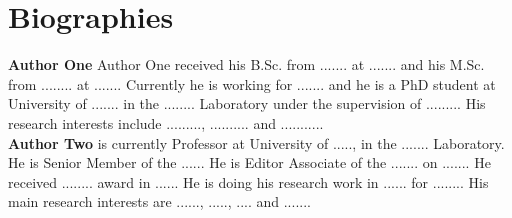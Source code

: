 \documentclass[a4paper, twoside]{article}
\begin{document}










\newpage
\section*{Biographies}

 \textbf{Author One} \small Author One received his B.Sc. from .......  at ....... and his M.Sc. from ........ at ....... Currently he is working for ....... and he is a PhD student at University of ....... in the ........ Laboratory under the supervision of ......... His research interests include .........,  .......... and ...........\\


\textbf{Author Two} \small is currently Professor at University of ....., in the ....... Laboratory. He is Senior Member of the ...... He is Editor Associate of the ....... on ....... He received ........ award in ...... He is doing his research work in ...... for ........ His main research interests are ......, ....., .... and .......\\
\end{document}
